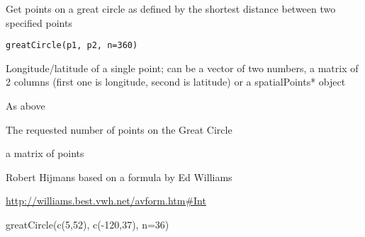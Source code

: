 \begin{Description}\relax
Get points on a great circle as defined by the shortest distance between two specified points
\end{Description}
\begin{Usage}
\begin{verbatim}
greatCircle(p1, p2, n=360) 
\end{verbatim}
\end{Usage}
\begin{Arguments}
\begin{ldescription}
\item[\code{p1}] Longitude/latitude of a single point; can be a vector of two numbers, a matrix of 2 columns (first one is longitude, second is latitude) or a spatialPoints* object
\item[\code{p2}] As above
\item[\code{n}] The requested number of points on the Great Circle
\end{ldescription}
\end{Arguments}
\begin{Value}
a matrix of points
\end{Value}
\begin{Author}\relax
Robert Hijmans based on a formula by Ed Williams
\end{Author}
\begin{References}\relax
\url{http://williams.best.vwh.net/avform.htm#Int}
\end{References}
\begin{Examples}
\begin{ExampleCode}
greatCircle(c(5,52), c(-120,37), n=36)
\end{ExampleCode}
\end{Examples}

